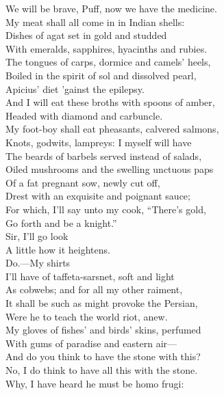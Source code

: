 \documentclass[a4paper,oneside,12pt]{memoir}
\begin{document}
\begin{drama*}
We will be brave, Puff, now we have the medicine.\\
My meat shall all come in in Indian shells:\\
Dishes of agat set in gold and studded\\
With emeralds, sapphires, hyacinths and rubies.\\
The tongues of carps, dormice and camels' heels,\\
Boiled in the spirit of sol and dissolved pearl,\\
Apicius' diet 'gainst the epilepsy.\\
And I will eat these broths with spoons of amber,\\
Headed with diamond and carbuncle.\\
My foot-boy shall eat pheasants, calvered salmons,\\
Knots, godwits, lampreys: I myself will have\\
The beards of barbels served instead of salads,\\
Oiled mushrooms and the swelling unctuous paps\\
Of a fat pregnant sow, newly cut off,\\
Drest with an exquisite and poignant sauce;\\
For which, I'll say unto my cook, ``There's gold,\\
Go forth and be a knight.''\\
\facespeaks {} Sir, I'll go look\\
A little how it heightens.\\
\mammonspeaks {} Do.---My shirts\\
I'll have of taffeta-sarsnet, soft and light\\
As cobwebs; and for all my other raiment,\\
It shall be such as might provoke the Persian,\\
Were he to teach the world riot, anew.\\
My gloves of fishes' and birds' skins, perfumed\\
With gums of paradise and eastern air---\\
\surlyspeaks And do you think to have the stone with this?\\
\mammonspeaks No, I do think to have all this with the stone.\\
\surlyspeaks Why, I have heard he must be homo frugi:\\

\end{drama*}
\end{document}
